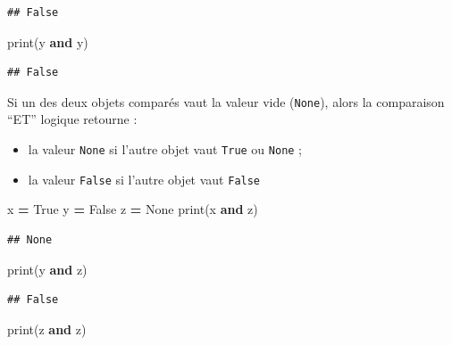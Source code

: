 \documentclass[12pt,]{book}
\newenvironment{Shaded}{\begin{snugshade}}{\end{snugshade}}
\newcommand{\KeywordTok}[1]{\textcolor[rgb]{0.13,0.29,0.53}{\textbf{#1}}}
\newcommand{\VariableTok}[1]{\textcolor[rgb]{0.00,0.00,0.00}{#1}}
\newcommand{\OperatorTok}[1]{\textcolor[rgb]{0.81,0.36,0.00}{\textbf{#1}}}
\newcommand{\BuiltInTok}[1]{#1}
\newcommand{\NormalTok}[1]{#1}
\providecommand{\tightlist}{%
  \setlength{\itemsep}{0pt}\setlength{\parskip}{0pt}}
\numberwithin{equation}{section}
\numberwithin{countremarque}{section}
\begin{document}
\begin{lstlisting}
## False
\end{lstlisting}

\begin{Shaded}
\begin{Highlighting}[]
\BuiltInTok{print}\NormalTok{(y }\KeywordTok{and}\NormalTok{ y)}
\end{Highlighting}
\end{Shaded}

\begin{lstlisting}
## False
\end{lstlisting}

Si un des deux objets comparés vaut la valeur vide (\texttt{None}),
alors la comparaison ``ET'' logique retourne :

\begin{itemize}
\tightlist
\item
  la valeur \texttt{None} si l'autre objet vaut \texttt{True} ou
  \texttt{None} ;
\item
  la valeur \texttt{False} si l'autre objet vaut \texttt{False}
\end{itemize}

\begin{Shaded}
\begin{Highlighting}[]
\NormalTok{x }\OperatorTok{=} \VariableTok{True}
\NormalTok{y }\OperatorTok{=} \VariableTok{False}
\NormalTok{z }\OperatorTok{=} \VariableTok{None}
\BuiltInTok{print}\NormalTok{(x }\KeywordTok{and}\NormalTok{ z)}
\end{Highlighting}
\end{Shaded}

\begin{lstlisting}
## None
\end{lstlisting}

\begin{Shaded}
\begin{Highlighting}[]
\BuiltInTok{print}\NormalTok{(y }\KeywordTok{and}\NormalTok{ z)}
\end{Highlighting}
\end{Shaded}

\begin{lstlisting}
## False
\end{lstlisting}

\begin{Shaded}
\begin{Highlighting}[]
\BuiltInTok{print}\NormalTok{(z }\KeywordTok{and}\NormalTok{ z)}
\end{Highlighting}
\end{Shaded}
\end{document}
